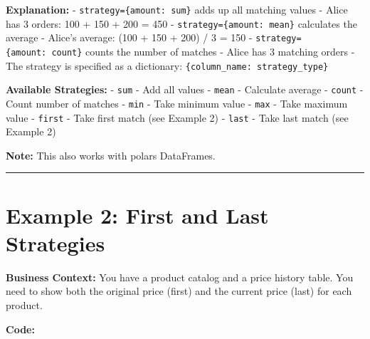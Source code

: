 \documentclass[
  letterpaper,
]{scrbook}
\begin{document}
\textbf{Explanation:} -
\texttt{strategy=\{\textquotesingle{}amount\textquotesingle{}:\ \textquotesingle{}sum\textquotesingle{}\}}
adds up all matching values - Alice has 3 orders: 100 + 150 + 200 = 450
-
\texttt{strategy=\{\textquotesingle{}amount\textquotesingle{}:\ \textquotesingle{}mean\textquotesingle{}\}}
calculates the average - Alice's average: (100 + 150 + 200) / 3 = 150 -
\texttt{strategy=\{\textquotesingle{}amount\textquotesingle{}:\ \textquotesingle{}count\textquotesingle{}\}}
counts the number of matches - Alice has 3 matching orders - The
strategy is specified as a dictionary:
\texttt{\{column\_name:\ strategy\_type\}}

\textbf{Available Strategies:} -
\texttt{\textquotesingle{}sum\textquotesingle{}} - Add all values -
\texttt{\textquotesingle{}mean\textquotesingle{}} - Calculate average -
\texttt{\textquotesingle{}count\textquotesingle{}} - Count number of
matches - \texttt{\textquotesingle{}min\textquotesingle{}} - Take
minimum value - \texttt{\textquotesingle{}max\textquotesingle{}} - Take
maximum value - \texttt{\textquotesingle{}first\textquotesingle{}} -
Take first match (see Example 2) -
\texttt{\textquotesingle{}last\textquotesingle{}} - Take last match (see
Example 2)

\textbf{Note:} This also works with polars DataFrames.

\begin{center}\rule{0.5\linewidth}{0.5pt}\end{center}

\section{Example 2: First and Last
Strategies}\label{example-2-first-and-last-strategies}

\textbf{Business Context:} You have a product catalog and a price
history table. You need to show both the original price (first) and the
current price (last) for each product.

\textbf{Code:}
\end{document}
